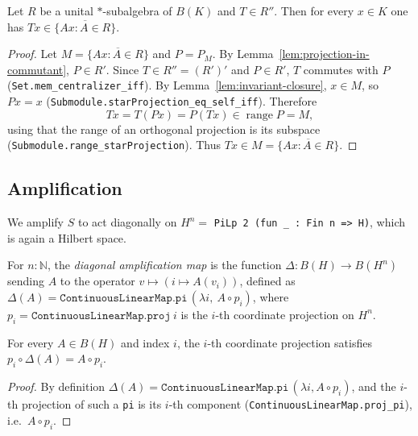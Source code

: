 \begin{lemma}
    \label{lem:single-vector-approx}
    \leanok
    Let $R$ be a unital $*$-subalgebra of $B(K)$ and $T \in R''$. Then for every
    $x \in K$ one has $T x \in \overline{\{A x : A \in R\}}$.
\end{lemma}
\begin{proof}
    Let $M = \overline{\{A x : A \in R\}}$ and $P = P_M$. By
    Lemma~\ref{lem:projection-in-commutant}, $P \in R'$. Since $T \in R'' = (R')'$
    and $P \in R'$, $T$ commutes with $P$
    (\texttt{Set.mem\_centralizer\_iff}). By
    Lemma~\ref{lem:invariant-closure}, $x \in M$, so $P x = x$
    (\texttt{Submodule.starProjection\_eq\_self\_iff}). Therefore
    \[
        T x = T (P x) = P (T x) \in \operatorname{range} P = M,
    \]
    using that the range of an orthogonal projection is its subspace
    (\texttt{Submodule.range\_starProjection}). Thus
    $T x \in M = \overline{\{A x : A \in R\}}$.
\end{proof}

\subsection{Amplification}

We amplify $S$ to act diagonally on $H^n = $ \texttt{PiLp 2 (fun \_ : Fin n => H)},
which is again a Hilbert space.

\begin{definition}
    \label{def:amplification-map}
    \leanok
    For $n : \mathbb N$, the \emph{diagonal amplification map} is the function
    $\Delta : B(H) \to B(H^n)$ sending $A$ to the operator
    $v \mapsto (i \mapsto A(v_i))$, defined as
    $\Delta(A) = \texttt{ContinuousLinearMap.pi}\,(\lambda i,\ A \circ p_i)$,
    where $p_i = \texttt{ContinuousLinearMap.proj}\ i$ is the $i$-th coordinate
    projection on $H^n$.
\end{definition}

\begin{lemma}
    \label{lem:amp-proj}
    \leanok
    For every $A \in B(H)$ and index $i$, the $i$-th coordinate projection
    satisfies $p_i \circ \Delta(A) = A \circ p_i$.
\end{lemma}
\begin{proof}
    By definition $\Delta(A) = \texttt{ContinuousLinearMap.pi}\,(\lambda i, A \circ p_i)$,
    and the $i$-th projection of such a \texttt{pi} is its $i$-th component
    (\texttt{ContinuousLinearMap.proj\_pi}), i.e.\ $A \circ p_i$.
\end{proof}

